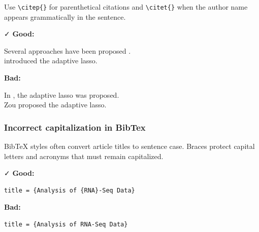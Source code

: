 \documentclass{article}
\newcommand{\xmark}{\textcolor{red}{\faXmark}}
\newcommand{\cmark}{\textcolor{goodcolor}{\faCheck}}
\newcommand{\bad}{\xmark\; \textbf{Bad:}}
\newcommand{\good}{\cmark\; \textbf{Good:}}
\begin{document}
Use \verb|\citep{}| for parenthetical citations and \verb|\citet{}| when the author name appears grammatically in the sentence.

\good

\begin{LTXexample}
Several approaches have been proposed
\citep{Fan2001, Zou2005}. \\

\citet{Zou2005} introduced the adaptive
lasso.
\end{LTXexample}

\bad

\begin{LTXexample}
In \citep{Zou2005}, the adaptive lasso was
proposed. \\

Zou \citep{Zou2005} proposed the adaptive
lasso.
\end{LTXexample}

\subsubsection*{Incorrect capitalization in BibTex}

BibTeX styles often convert article titles to sentence case. Braces protect capital letters and acronyms that must remain capitalized.

\good

\begin{center}
\begin{minipage}{0.46\textwidth}
\begin{lstlisting}
title = {Analysis of {RNA}-Seq Data}
\end{lstlisting}
\end{minipage}
\hfill
\begin{minipage}{0.46\textwidth}
  \vspace{0.1em}
\end{minipage}
\end{center}

\bad

\begin{center}
\begin{minipage}{0.46\textwidth}
\begin{lstlisting}
title = {Analysis of RNA-Seq Data}
\end{lstlisting}
\end{minipage}
\hfill
\begin{minipage}{0.46\textwidth}
  \vspace{0.1em}
\end{minipage}
\end{center}
\end{document}

